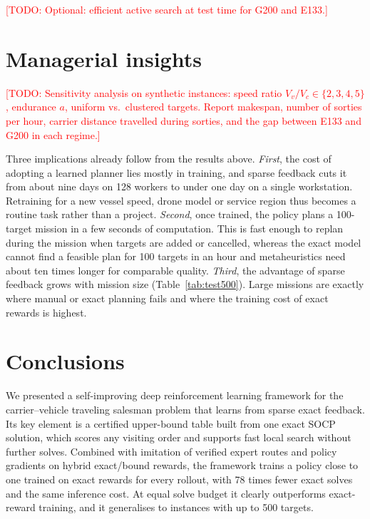 \documentclass[preprint,review,12pt,authoryear]{elsarticle}
\newcommand{\todo}[1]{\textcolor{red}{[TODO: #1]}}
\begin{document}
\todo{Optional: efficient active search \citep{hottung2022efficient} at test time for G200 and E133.}

\section{Managerial insights}\label{sec:managerial}
\todo{Sensitivity analysis on synthetic instances: speed ratio $V_v/V_c\in\{2,3,4,5\}$, endurance $a$, uniform
vs.\ clustered targets. Report makespan, number of sorties per hour, carrier distance travelled during sorties,
and the gap between E133 and G200 in each regime.}

Three implications already follow from the results above.
\emph{First}, the cost of adopting a learned planner lies mostly in training, and sparse feedback cuts it from
about nine days on 128 workers to under one day on a single workstation. Retraining for a new vessel speed,
drone model or service region thus becomes a routine task rather than a project.
\emph{Second}, once trained, the policy plans a 100-target mission in a few seconds of computation. This is
fast enough to replan during the mission when targets are added or cancelled, whereas the exact model cannot
find a feasible plan for 100 targets in an hour and metaheuristics need about ten times longer for comparable
quality.
\emph{Third}, the advantage of sparse feedback grows with mission size (Table~\ref{tab:test500}). Large
missions are exactly where manual or exact planning fails and where the training cost of exact rewards is highest.

\section{Conclusions}\label{sec:conc}
We presented a self-improving deep reinforcement learning framework for the carrier--vehicle traveling
salesman problem that learns from sparse exact feedback. Its key element is a certified upper-bound table built
from one exact SOCP solution, which scores any visiting order and supports fast local search without further
solves. Combined with imitation of verified expert routes and policy gradients on hybrid exact/bound rewards,
the framework trains a policy close to one trained on exact rewards for every rollout, with 78 times fewer exact
solves and the same inference cost. At equal solve budget it clearly outperforms exact-reward training, and it
generalises to instances with up to 500 targets.
\end{document}
